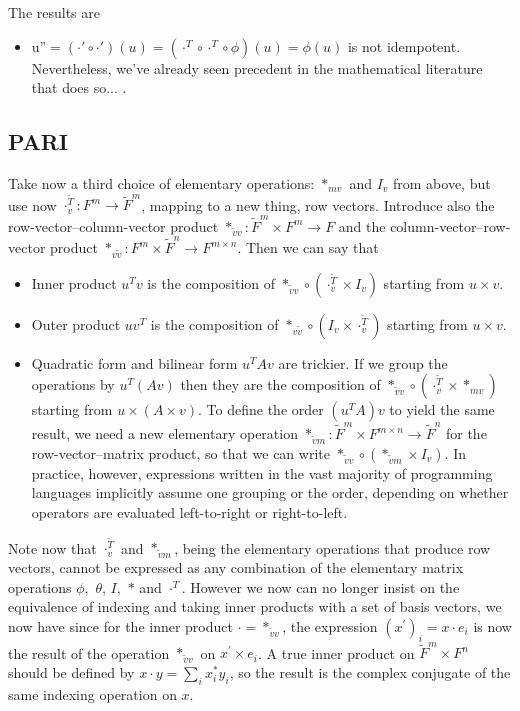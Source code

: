 The results are
\begin{itemize}
\item u''$=\left(\cdot'\circ\cdot'\right)\left(u\right)=\left(\cdot^{T}\circ\cdot^{T}\circ\phi\right)\left(u\right)=\phi\left(u\right)$
is not idempotent. Nevertheless, we've already seen precedent in the
mathematical literature that does so... .
\end{itemize}

\subsection{PARI}

Take now a third choice of elementary operations: $*_{mv}$ and $I_{v}$
from above, but use now $\cdot_{v}^{\tilde{T}}:F^{m}\rightarrow\tilde{F}^{m}$,
mapping to a new thing, row vectors. Introduce also the row-vector–column-vector
product $*_{\tilde{v}v}:\tilde{F}^{m}\times F^{m}\rightarrow F$ and
the column-vector–row-vector product $*_{v\tilde{v}}:F^{m}\times\tilde{F}^{n}\rightarrow F^{m\times n}$.
Then we can say that
\begin{itemize}
\item Inner product $u^{T}v$ is the composition of $*_{\tilde{v}v}\circ\left(\cdot_{v}^{\tilde{T}}\times I_{v}\right)$
starting from $u\times v$.
\item Outer product $uv^{T}$ is the composition of $*_{v\tilde{v}}\circ\left(I_{v}\times\cdot_{v}^{\tilde{T}}\right)$
starting from $u\times v$.
\item Quadratic form and bilinear form $u^{T}Av$ are trickier. If we group
the operations by $u^{T}\left(Av\right)$ then they are the composition
of $*_{\tilde{v}v}\circ\left(\cdot_{v}^{\tilde{T}}\times*_{mv}\right)$
starting from $u\times\left(A\times v\right)$. To define the order
$\left(u^{T}A\right)v$ to yield the same result, we need a new elementary
operation $*_{\tilde{v}m}:\tilde{F}^{m}\times F^{m\times n}\rightarrow\tilde{F}^{n}$
for the row-vector–matrix product, so that we can write $*_{\tilde{v}v}\circ\left(*_{\tilde{v}m}\times I_{v}\right)$.
In practice, however, expressions written in the vast majority of
programming languages implicitly assume one grouping or the order,
depending on whether operators are evaluated left-to-right or right-to-left.
\end{itemize}
Note now that $\cdot_{v}^{\tilde{T}}$ and $*_{\tilde{v}m}$, being
the elementary operations that produce row vectors, cannot be expressed
as any combination of the elementary matrix operations $\phi,$ $\theta$,
$I,$ $*$ and $\cdot^{T}$. However we now can no longer insist on
the equivalence of indexing and taking inner products with a set of
basis vectors, we now have since for the inner product $\cdot=*_{\tilde{v}v}$,
the expression $\left(x^{\prime}\right)_{i}=x\cdot e_{i}$ is now
the result of the operation $*_{\tilde{v}v}$ on $x^{\prime}\times e_{i}$.
A true inner product on $\tilde{F}^{m}\times F^{n}$ should be defined
by $x\cdot y=\sum_{i}x_{i}^{*}y_{i}$, so the result is the complex
conjugate of the same indexing operation on $x$.


